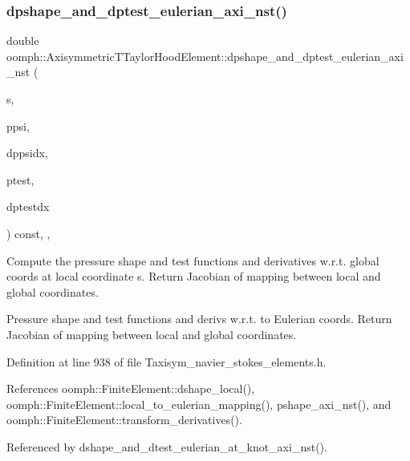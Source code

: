 \subsubsection{\texorpdfstring{dpshape\+\_\+and\+\_\+dptest\+\_\+eulerian\+\_\+axi\+\_\+nst()}{dpshape\_and\_dptest\_eulerian\_axi\_nst()}}
{\footnotesize\ttfamily double oomph\+::\+Axisymmetric\+T\+Taylor\+Hood\+Element\+::dpshape\+\_\+and\+\_\+dptest\+\_\+eulerian\+\_\+axi\+\_\+nst (\begin{DoxyParamCaption}\item[{const \hyperlink{classoomph_1_1Vector}{Vector}$<$ double $>$ \&}]{s,  }\item[{\hyperlink{classoomph_1_1Shape}{Shape} \&}]{ppsi,  }\item[{\hyperlink{classoomph_1_1DShape}{D\+Shape} \&}]{dppsidx,  }\item[{\hyperlink{classoomph_1_1Shape}{Shape} \&}]{ptest,  }\item[{\hyperlink{classoomph_1_1DShape}{D\+Shape} \&}]{dptestdx }\end{DoxyParamCaption}) const\hspace{0.3cm}{\ttfamily [inline]}, {\ttfamily [protected]}, {\ttfamily [virtual]}}



Compute the pressure shape and test functions and derivatives w.\+r.\+t. global coords at local coordinate s. Return Jacobian of mapping between local and global coordinates. 

Pressure shape and test functions and derivs w.\+r.\+t. to Eulerian coords. Return Jacobian of mapping between local and global coordinates. 

Definition at line 938 of file Taxisym\+\_\+navier\+\_\+stokes\+\_\+elements.\+h.



References oomph\+::\+Finite\+Element\+::dshape\+\_\+local(), oomph\+::\+Finite\+Element\+::local\+\_\+to\+\_\+eulerian\+\_\+mapping(), pshape\+\_\+axi\+\_\+nst(), and oomph\+::\+Finite\+Element\+::transform\+\_\+derivatives().



Referenced by dshape\+\_\+and\+\_\+dtest\+\_\+eulerian\+\_\+at\+\_\+knot\+\_\+axi\+\_\+nst().

\mbox{\label{classoomph_1_1AxisymmetricTTaylorHoodElement_a1a696cb60dd4f10db4e6d5a8b4571a7d}} 
